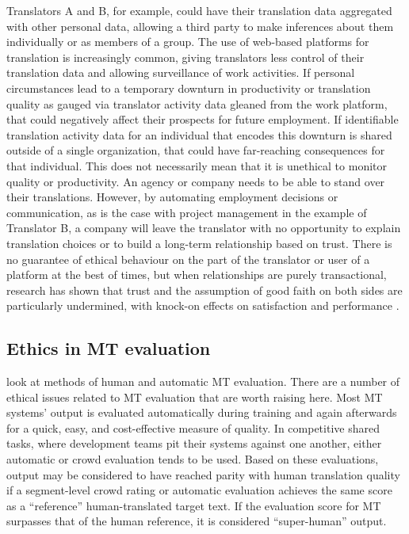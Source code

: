 \documentclass[output=paper]{langscibook}
\begin{document}
Translators A and B, for example, could have their translation data aggregated with other personal data, allowing a third party to make inferences about them individually or as members of a group. The use of web-based platforms for translation is increasingly common, giving translators less control of their translation data and allowing surveillance of work activities. If personal circumstances lead to a temporary downturn in productivity or translation quality as gauged via translator activity data gleaned from the work platform, that could negatively affect their prospects for future employment. If identifiable translation activity data for an individual that encodes this downturn is shared outside of a single organization, that could have far-reaching consequences for that individual. This does not necessarily mean that it is unethical to monitor quality or productivity. An agency or company needs to be able to stand over their translations. However, by automating employment decisions or communication, as is the case with project management in the example of Translator B, a company will leave the translator with no opportunity to explain translation choices or to build a long-term relationship based on trust. There is no guarantee of ethical behaviour on the part of the translator or user of a platform at the best of times, but when relationships are purely transactional, research has shown that trust and the assumption of good faith on both sides are particularly undermined, with knock-on effects on satisfaction and performance \citep{WhippleNyaga2010}.

\subsection{Ethics in MT evaluation}

 look at methods of human and automatic MT evaluation. There are a number of ethical issues related to MT evaluation that are worth raising here. Most MT systems’ output is evaluated automatically during training and again afterwards for a quick, easy, and cost-effective measure of quality. In competitive shared tasks, where development teams pit their systems against one another, either automatic or crowd evaluation tends to be used. Based on these evaluations, output may be considered to have reached parity with human translation quality if a segment-level crowd rating or automatic evaluation achieves the same score as a “reference” human-translated target text. If the evaluation score for MT surpasses that of the human reference, it is considered “super-human” output.
\end{document}
